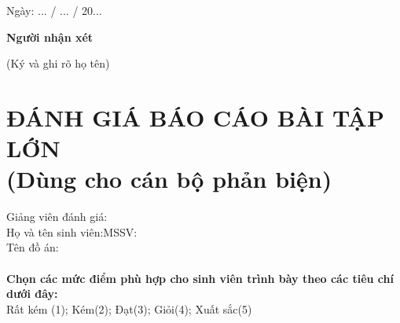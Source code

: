 \hspace{9cm} Ngày: ... / ... / 20...

\hspace{9.3cm}\textbf{Người nhận xét}

\vspace{-6pt}
\hspace{9cm}(Ký và ghi rõ họ tên)
\cleardoublepage

\section*{ĐÁNH GIÁ BÁO CÁO BÀI TẬP LỚN\\\fontsize{14pt}{0pt}\selectfont \vspace{4pt}\textnormal{(Dùng cho cán bộ phản biện)}}
\thispagestyle{empty}
\vspace{-16pt}
\hspace{-1cm}Giảng viên đánh giá:\dotfill\\
Họ và tên sinh viên:\dotfill MSSV:\dotfill\\
Tên đồ án:\dotfill\\
\\
\textbf{Chọn các mức điểm phù hợp cho sinh viên trình bày theo các tiêu chí dưới đây:}\\
Rất kém (1); Kém(2); Đạt(3); Giỏi(4); Xuất sắc(5)
